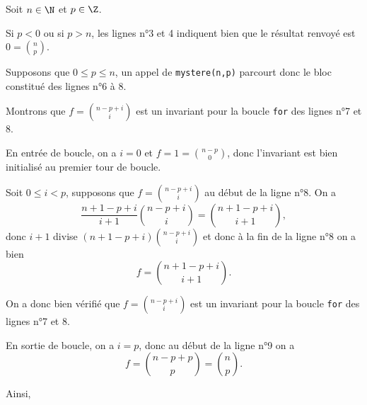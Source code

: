 \exer{}
\setcounter{numques}{0}

Soit $n\in\N$ et $p\in\Z$.

Si $p < 0$ ou si $p > n$, les lignes n°3 et 4 indiquent bien que le résultat renvoyé est $\displaystyle 0 = \binom{n}{p}$.

Supposons que $0 \leq p \leq n$, un appel de \texttt{mystere(n,p)} parcourt donc le bloc constitué des lignes n°6 à 8.

Montrons que \og $\displaystyle f = \binom{n-p+i}{i}$ \fg{} est un invariant pour la boucle \texttt{for} des lignes n°7 et 8. 

En entrée de boucle, on a $i = 0$ et $\displaystyle f = 1 = \binom{n-p}{0}$, donc l'invariant est bien initialisé au premier tour de boucle. 

Soit $0 \leq i < p$, supposons que $\displaystyle f = \binom{n-p+i}{i}$ au début de la ligne n°8. On a 
\begin{equation*}
  \dfrac{n+1-p+i}{i+1}\binom{n-p+i}{i} = \binom{n+1-p+i}{i+1},
\end{equation*}
donc $i+1$ divise $\displaystyle (n+1-p+i) \binom{n-p+i}{i}$ et donc à la fin de la ligne n°8 on a bien 
\begin{equation*}
  f = \binom{n+1-p+i}{i+1}.
\end{equation*}

On a donc bien vérifié que \og $\displaystyle f = \binom{n-p+i}{i}$ \fg{} est un invariant pour la boucle \texttt{for} des lignes n°7 et 8. 

En sortie de boucle, on a $i = p$, donc au début de la ligne n°9 on a 
\begin{equation*}
  f = \binom{n-p + p}{p} = \binom{n}{p}.
\end{equation*}

Ainsi, 
\begin{center}
\end{center}

